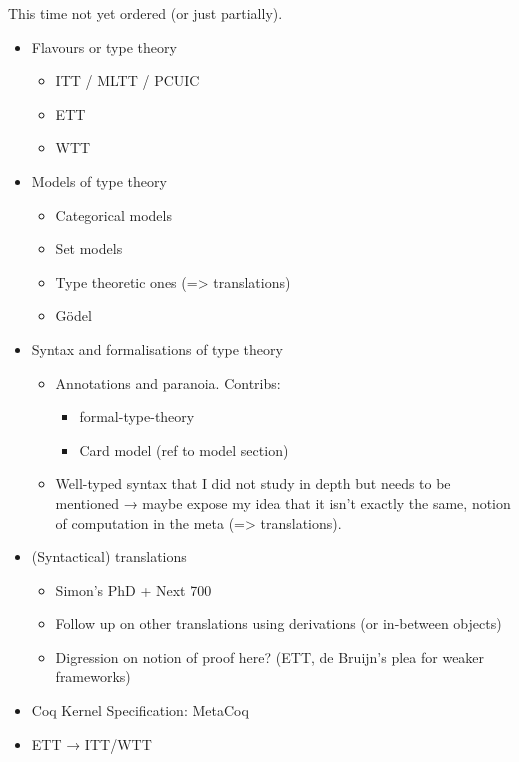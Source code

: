 This time not yet ordered (or just partially).

\begin{itemize}
  \item Flavours or type theory
    \begin{itemize}
      \item ITT / MLTT / PCUIC
      \item ETT
      \item WTT
    \end{itemize}
  \item Models of type theory
    \begin{itemize}
      \item Categorical models
      \item Set models
      \item Type theoretic ones (=> translations)
      \item Gödel
    \end{itemize}
  \item Syntax and formalisations of type theory
    \begin{itemize}
      \item Annotations and paranoia. Contribs:
        \begin{itemize}
          \item formal-type-theory
          \item Card model (ref to model section)
        \end{itemize}
      \item Well-typed syntax that I did not study in depth but needs to be
      mentioned → maybe expose my idea that it isn't exactly the same,
      notion of computation in the meta (=> translations).
    \end{itemize}
  \item (Syntactical) translations
    \begin{itemize}
      \item Simon's PhD + Next 700
      \item Follow up on other translations using derivations (or in-between
      objects)
      \item Digression on notion of proof here? (ETT, de Bruijn's plea for
      weaker frameworks)
    \end{itemize}
  \item Coq Kernel Specification: MetaCoq
  \item ETT → ITT/WTT
\end{itemize}